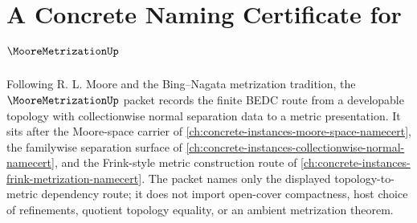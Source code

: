 \chapter{A Concrete Naming Certificate for $\MooreMetrizationUp$}
\label{ch:concrete-instances-moore-metrization-namecert}

Following R. L. Moore and the Bing--Nagata metrization tradition, the $\MooreMetrizationUp$ packet records the finite BEDC route from a developable topology with collectionwise normal separation data to a metric presentation. It sits after the Moore-space carrier of \autoref{ch:concrete-instances-moore-space-namecert}, the familywise separation surface of \autoref{ch:concrete-instances-collectionwise-normal-namecert}, and the Frink-style metric construction route of \autoref{ch:concrete-instances-frink-metrization-namecert}. The packet names only the displayed topology-to-metric dependency route; it does not import open-cover compactness, host choice of refinements, quotient topology equality, or an ambient metrization theorem.

